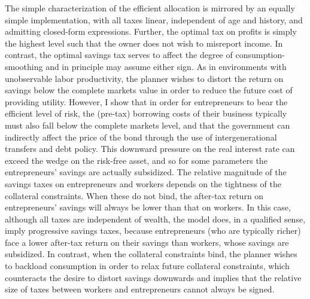 \documentclass[11pt]{article}
\theoremstyle{plain}
\theoremstyle{definition} %
\begin{document}
The simple characterization of the efficient allocation is mirrored by an equally simple implementation, with all taxes linear, independent of age and history, and admitting closed-form expressions. Further, the optimal tax on profits is simply the highest level such that the owner does not wish to misreport income. In contrast, the optimal savings tax serves to affect the degree of consumption-smoothing and in principle may assume either sign. As in environments with unobservable labor productivity, the planner wishes to distort the return on savings below the complete markets value in order to reduce the future cost of providing utility. However, I show that in order for entrepreneurs to bear the efficient level of risk, the (pre-tax) borrowing costs of their business typically must also fall below the complete markets level, and that the government can indirectly affect the price of the bond through the use of intergenerational transfers and debt policy. This downward pressure on the real interest rate can exceed the wedge on the risk-free asset, and so for some parameters the entrepreneurs' savings are actually subsidized. The relative magnitude of the savings taxes on entrepreneurs and workers depends on the tightness of the collateral constraints. When these do not bind, the after-tax return on entrepreneurs' savings will always be lower than that on workers. In this case, although all taxes are independent of wealth, the model does, in a qualified sense, imply progressive savings taxes, because entrepreneurs (who are typically richer) face a lower after-tax return on their savings than workers, whose savings are subsidized. In contrast, when the collateral constraints bind, the planner wishes to backload consumption in order to relax future collateral constraints, which counteracts the desire to distort savings downwards and implies that the relative size of taxes between workers and entrepreneurs cannot always be signed.
\end{document}
